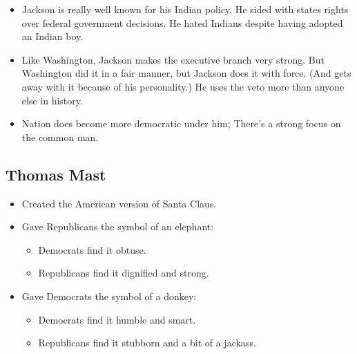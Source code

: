 \documentclass{article}
\begin{document}
\begin{itemize}
        \item Jackson is really well known for his Indian policy. He sided with states rights over federal government decisions. He hated Indians despite having adopted an Indian boy.
        \item Like Washington, Jackson makes the executive branch very strong. But Washington did it in a fair manner, but Jackson does it with force. (And gets away with it because of his personality.) He uses the veto more than anyone else in history.
        \item Nation does become more democratic under him; There's a strong focus on the common man.
      \end{itemize}

      \subsection{Thomas Mast}
        \begin{itemize}
          \item Created the American version of Santa Claus.
          \item Gave Republicans the symbol of an elephant:
            \begin{itemize}
              \item Democrats find it obtuse.
              \item Republicans find it dignified and strong.
            \end{itemize}
          \item Gave Democrats the symbol of a donkey:
            \begin{itemize}
              \item Democrats find it humble and smart.
              \item Republicans find it stubborn and a bit of a jackass.
            \end{itemize}
        \end{itemize}
\end{document}
